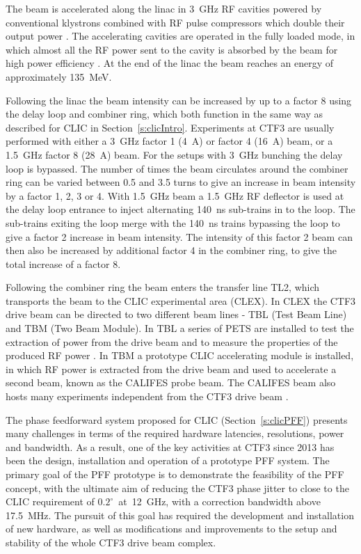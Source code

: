 The beam is accelerated along the linac in 3~GHz RF cavities powered by conventional klystrons combined with RF pulse compressors which double their output power \cite{rfCompress}. The accelerating cavities are operated in the fully loaded mode, in which almost all the RF power sent to the cavity is absorbed by the beam for high power efficiency \cite{fullyLoaded}. At the end of the linac the beam reaches an energy of approximately 135~MeV.

Following the linac the beam intensity can be increased by up to a factor 8 using the delay loop and combiner ring, which both function in the same way as described for CLIC in Section~\ref{s:clicIntro}. Experiments at CTF3 are usually performed with either a 3~GHz factor 1 (4~A) or factor 4 (16~A) beam, or a 1.5~GHz factor 8 (28~A) beam. For the setups with 3~GHz bunching the delay loop is bypassed. The number of times the beam circulates around the combiner ring can be varied between 0.5 and 3.5 turns to give an increase in beam intensity by a factor 1, 2, 3 or 4. With 1.5~GHz beam a 1.5~GHz RF deflector \cite{rfDeflect} is used at the delay loop entrance to inject alternating 140~ns sub-trains in to the loop. The sub-trains exiting the loop merge with the 140~ns trains bypassing the loop to give a factor 2 increase in beam intensity. The intensity of this factor 2 beam can then also be increased by additional factor 4 in the combiner ring, to give the total increase of a factor 8.

Following the combiner ring the beam enters the transfer line TL2, which transports the beam to the CLIC experimental area (CLEX). In CLEX the CTF3 drive beam can be directed to two different beam lines - TBL (Test Beam Line) and TBM (Two Beam Module). In TBL a series of PETS are installed to test the extraction of power from the drive beam and to measure the properties of the produced RF power \cite{tbl}. In TBM a prototype CLIC accelerating module is installed, in which RF power is extracted from the drive beam and used to accelerate a second beam, known as the CALIFES probe beam. The CALIFES beam also hosts many experiments independent from the CTF3 drive beam \cite{califes}.


The phase feedforward system proposed for CLIC (Section~\ref{s:clicPFF}) presents many challenges in terms of the required hardware latencies, resolutions, power and bandwidth. As a result, one of the key activities at CTF3 since 2013 has been the design, installation and operation of a prototype PFF system. The primary goal of the PFF prototype is to demonstrate the feasibility of the PFF concept, with the ultimate aim of reducing the CTF3 phase jitter to close to the CLIC requirement of \(0.2^\circ\)~at~12~GHz, with a correction bandwidth above 17.5~MHz. The pursuit of this goal has required the development and installation of new hardware, as well as modifications and improvements to the setup and stability of the whole CTF3 drive beam complex.

